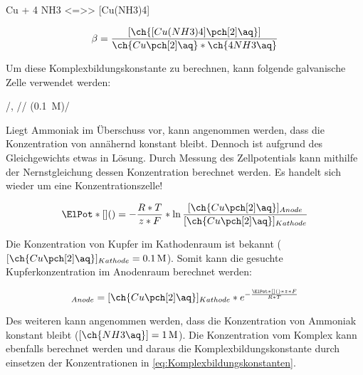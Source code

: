 \documentclass{article}
\begin{document}
        \begin{reaction}
          Cu\pch[2]\aq{} + 4 NH3\aq{} <=>> [Cu(NH3)4]\pch[2]\aq \label{rec:Komplexbilgun}
        \end{reaction}
        
        \begin{equation}
          \beta = \frac{[\ch{[Cu(NH3)4]\pch[2]\aq}]}{\ch{Cu\pch[2]\aq} * \ch{4 NH3\aq}} \label{eq:Komplexbildungskonstanten}
        \end{equation}
        
        Um diese Komplexbildungskonstante zu berechnen, kann folgende galvanische Zelle verwendet werden:
        
        \begin{center}
          /\ch{[Cu(NH3)4]\pch[2]\aq}, //  (\SI[mode=text]{0.1}{M})/
        \end{center}
        
        Liegt Ammoniak im Überschuss vor, kann angenommen werden, dass die Konzentration von \ch{[Cu(NH3)4]\pch[2]\aq} annähernd konstant bleibt. Dennoch ist aufgrund des Gleichgewichts etwas  in Lösung. Durch Messung des Zellpotentials kann mithilfe der Nernstgleichung dessen Konzentration berechnet werden. Es handelt sich wieder um eine Konzentrationszelle!
        
        \begin{equation}
          \ElPot*[](){} = - \frac{R * T}{z * F} * \ln \frac{[\ch{Cu\pch[2]\aq}]_{Anode}}{[\ch{Cu\pch[2]\aq}]_{Kathode}}
        \end{equation}
        
        Die Konzentration von Kupfer im Kathodenraum ist bekannt ($[\ch{Cu\pch[2]\aq}]_{Kathode} = \SI[mode=text]{0.1}{M}$). Somit kann die gesuchte Kupferkonzentration im Anodenraum berechnet werden:
        
        \begin{equation}
          [\ch{Cu\pch[2]\aq}]_{Anode} = [\ch{Cu\pch[2]\aq}]_{Kathode} * e^{- \frac{\ElPot*[](){} * z * F}{R * T}}
        \end{equation}
        
        Des weiteren kann angenommen werden, dass die Konzentration von Ammoniak konstant bleibt ($[\ch{NH3\aq}] = \SI[mode=text]{1}{M}$). Die Konzentration vom Komplex kann ebenfalls berechnet werden und daraus die Komplexbildungskonstante durch einsetzen der Konzentrationen in \eqref{eq:Komplexbildungskonstanten}. 
        
\end{document}
